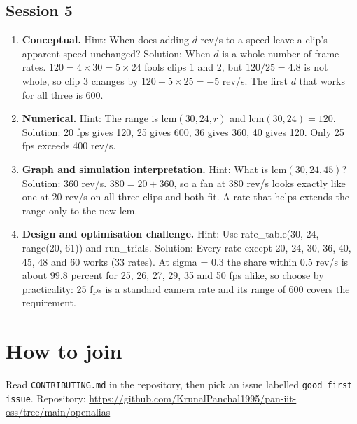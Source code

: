 \documentclass[11pt,a4paper]{article}
\begin{document}
\subsection*{Session 5}
\begin{enumerate}[nosep]
\item \textbf{Conceptual.} Hint: When does adding $d$ rev/s to a speed leave a clip's apparent speed unchanged? Solution: When $d$ is a whole number of frame rates. $120=4\times30=5\times24$ fools clips 1 and 2, but $120/25=4.8$ is not whole, so clip 3 changes by $120-5\times25=-5$ rev/s. The first $d$ that works for all three is 600.
\item \textbf{Numerical.} Hint: The range is $\mathrm{lcm}(30,24,r)$ and $\mathrm{lcm}(30,24)=120$. Solution: 20 fps gives 120, 25 gives 600, 36 gives 360, 40 gives 120. Only 25 fps exceeds 400 rev/s.
\item \textbf{Graph and simulation interpretation.} Hint: What is $\mathrm{lcm}(30,24,45)$? Solution: 360 rev/s. $380=20+360$, so a fan at 380 rev/s looks exactly like one at 20 rev/s on all three clips and both fit. A rate that helps extends the range only to the new lcm.
\item \textbf{Design and optimisation challenge.} Hint: Use rate\_table(30, 24, range(20, 61)) and run\_trials. Solution: Every rate except 20, 24, 30, 36, 40, 45, 48 and 60 works (33 rates). At sigma = 0.3 the share within 0.5 rev/s is about 99.8 percent for 25, 26, 27, 29, 35 and 50 fps alike, so choose by practicality: 25 fps is a standard camera rate and its range of 600 covers the requirement.
\end{enumerate}

\section{How to join}
Read \texttt{CONTRIBUTING.md} in the repository, then pick an issue labelled \texttt{good first issue}. Repository: \url{https://github.com/KrunalPanchal1995/pan-iit-oss/tree/main/openalias}
\end{document}
